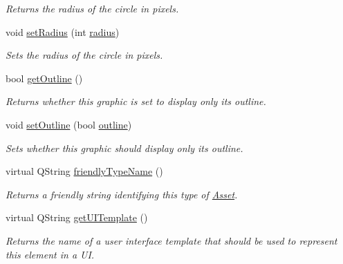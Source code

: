 \begin{DoxyCompactItemize}
\begin{DoxyCompactList}\small\item\em Returns the radius of the circle in pixels. \end{DoxyCompactList}\item 
\hypertarget{class_picto_1_1_circle_graphic_a5e635894bad7320ecb258da84e898f11}{void \hyperlink{class_picto_1_1_circle_graphic_a5e635894bad7320ecb258da84e898f11}{set\-Radius} (int \hyperlink{class_picto_1_1_circle_graphic_a574ae580b977bfec39184f209f816cab}{radius})}\label{class_picto_1_1_circle_graphic_a5e635894bad7320ecb258da84e898f11}

\begin{DoxyCompactList}\small\item\em Sets the radius of the circle in pixels. \end{DoxyCompactList}\item 
\hypertarget{class_picto_1_1_circle_graphic_ac90b9086e21289eb2a4066a70fe94078}{bool \hyperlink{class_picto_1_1_circle_graphic_ac90b9086e21289eb2a4066a70fe94078}{get\-Outline} ()}\label{class_picto_1_1_circle_graphic_ac90b9086e21289eb2a4066a70fe94078}

\begin{DoxyCompactList}\small\item\em Returns whether this graphic is set to display only its outline. \end{DoxyCompactList}\item 
\hypertarget{class_picto_1_1_circle_graphic_a8e418a585260dd6dadb81ab6ef41ed6d}{void \hyperlink{class_picto_1_1_circle_graphic_a8e418a585260dd6dadb81ab6ef41ed6d}{set\-Outline} (bool \hyperlink{class_picto_1_1_circle_graphic_ac94afcac35d083f3894161b680eb4003}{outline})}\label{class_picto_1_1_circle_graphic_a8e418a585260dd6dadb81ab6ef41ed6d}

\begin{DoxyCompactList}\small\item\em Sets whether this graphic should display only its outline. \end{DoxyCompactList}\item 
virtual Q\-String \hyperlink{class_picto_1_1_circle_graphic_afb3d4cb1c8d9709d9612793762178be6}{friendly\-Type\-Name} ()
\begin{DoxyCompactList}\small\item\em Returns a friendly string identifying this type of \hyperlink{class_picto_1_1_asset}{Asset}. \end{DoxyCompactList}\item 
\hypertarget{class_picto_1_1_circle_graphic_a8a04ac0e52a99a1492968ec67b17705f}{virtual Q\-String \hyperlink{class_picto_1_1_circle_graphic_a8a04ac0e52a99a1492968ec67b17705f}{get\-U\-I\-Template} ()}\label{class_picto_1_1_circle_graphic_a8a04ac0e52a99a1492968ec67b17705f}

\begin{DoxyCompactList}\small\item\em Returns the name of a user interface template that should be used to represent this element in a U\-I. \end{DoxyCompactList}\end{DoxyCompactItemize}
